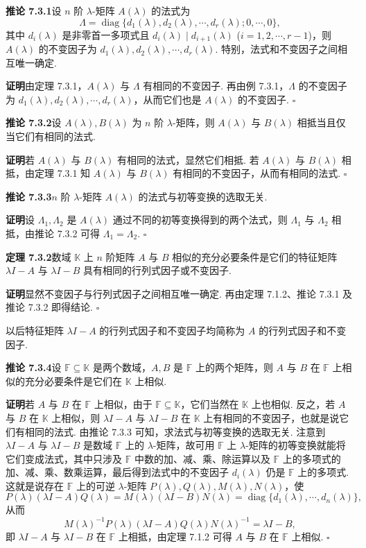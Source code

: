 \documentclass[UTF8, 12pt, fontset=fandol, oneside]{ctexart}
\begin{document}
\noindent\textbf{推论 7.3.1}\quad 设 $n$ 阶 $\lambda$-矩阵 $A(\lambda)$ 的法式为
\[
\Lambda=\operatorname{diag}\{d_1(\lambda),d_2(\lambda),\cdots,d_r(\lambda);0,\cdots,0\},
\]
其中 $d_i(\lambda)$ 是非零首一多项式且 $d_i(\lambda)\mid d_{i+1}(\lambda)$ ($i=1,2,\cdots,r-1$)，则 $A(\lambda)$ 的不变因子为 $d_1(\lambda),d_2(\lambda),\cdots,d_r(\lambda)$. 特别，法式和不变因子之间相互唯一确定.

\noindent\textbf{证明}\quad 由定理 7.3.1，$A(\lambda)$ 与 $\Lambda$ 有相同的不变因子. 再由例 7.3.1，$\Lambda$ 的不变因子为 $d_1(\lambda),d_2(\lambda),\cdots,d_r(\lambda)$，从而它们也是 $A(\lambda)$ 的不变因子. $\square$

\noindent\textbf{推论 7.3.2}\quad 设 $A(\lambda),B(\lambda)$ 为 $n$ 阶 $\lambda$-矩阵，则 $A(\lambda)$ 与 $B(\lambda)$ 相抵当且仅当它们有相同的法式.

\noindent\textbf{证明}\quad 若 $A(\lambda)$ 与 $B(\lambda)$ 有相同的法式，显然它们相抵. 若 $A(\lambda)$ 与 $B(\lambda)$ 相抵，由定理 7.3.1 知 $A(\lambda)$ 与 $B(\lambda)$ 有相同的不变因子，从而有相同的法式. $\square$

\noindent\textbf{推论 7.3.3}\quad $n$ 阶 $\lambda$-矩阵 $A(\lambda)$ 的法式与初等变换的选取无关.

\noindent\textbf{证明}\quad 设 $\Lambda_1,\Lambda_2$ 是 $A(\lambda)$ 通过不同的初等变换得到的两个法式，则 $\Lambda_1$ 与 $\Lambda_2$ 相抵，由推论 7.3.2 可得 $\Lambda_1=\Lambda_2$. $\square$

\noindent\textbf{定理 7.3.2}\quad 数域 $\mathbb{K}$ 上 $n$ 阶矩阵 $A$ 与 $B$ 相似的充分必要条件是它们的特征矩阵 $\lambda I-A$ 与 $\lambda I-B$ 具有相同的行列式因子或不变因子.

\noindent\textbf{证明}\quad 显然不变因子与行列式因子之间相互唯一确定. 再由定理 7.1.2、推论 7.3.1 及推论 7.3.2 即得结论. $\square$

以后特征矩阵 $\lambda I-A$ 的行列式因子和不变因子均简称为 $A$ 的行列式因子和不变因子.

\noindent\textbf{推论 7.3.4}\quad 设 $\mathbb{F}\subseteq\mathbb{K}$ 是两个数域，$A,B$ 是 $\mathbb{F}$ 上的两个矩阵，则 $A$ 与 $B$ 在 $\mathbb{F}$ 上相似的充分必要条件是它们在 $\mathbb{K}$ 上相似.

\noindent\textbf{证明}\quad 若 $A$ 与 $B$ 在 $\mathbb{F}$ 上相似，由于 $\mathbb{F}\subseteq\mathbb{K}$，它们当然在 $\mathbb{K}$ 上也相似. 反之，若 $A$ 与 $B$ 在 $\mathbb{K}$ 上相似，则 $\lambda I-A$ 与 $\lambda I-B$ 在 $\mathbb{K}$ 上有相同的不变因子，也就是说它们有相同的法式. 由推论 7.3.3 可知，求法式与初等变换的选取无关. 注意到 $\lambda I-A$ 与 $\lambda I-B$ 是数域 $\mathbb{F}$ 上的 $\lambda$-矩阵，故可用 $\mathbb{F}$ 上 $\lambda$-矩阵的初等变换就能将它们变成法式，其中只涉及 $\mathbb{F}$ 中数的加、减、乘、除运算以及 $\mathbb{F}$ 上的多项式的加、减、乘、数乘运算，最后得到法式中的不变因子 $d_i(\lambda)$ 仍是 $\mathbb{F}$ 上的多项式. 这就是说存在 $\mathbb{F}$ 上的可逆 $\lambda$-矩阵 $P(\lambda),Q(\lambda),M(\lambda),N(\lambda)$，使
\[
P(\lambda)(\lambda I-A)Q(\lambda)=M(\lambda)(\lambda I-B)N(\lambda)=\operatorname{diag}\{d_1(\lambda),\cdots,d_n(\lambda)\},
\]
从而
\[
M(\lambda)^{-1}P(\lambda)(\lambda I-A)Q(\lambda)N(\lambda)^{-1}=\lambda I-B,
\]
即 $\lambda I-A$ 与 $\lambda I-B$ 在 $\mathbb{F}$ 上相抵，由定理 7.1.2 可得 $A$ 与 $B$ 在 $\mathbb{F}$ 上相似. $\square$
\end{document}
